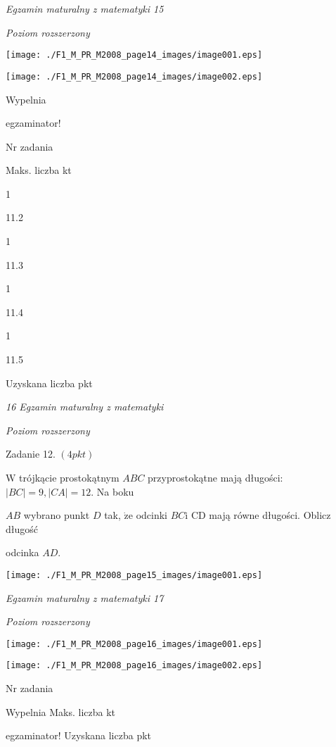 \documentclass[a4paper,12pt]{article}
\begin{document}
{\it Egzamin maturalny z matematyki 15}

{\it Poziom rozszerzony}
\begin{center}
\texttt{[image: ./F1\_M\_PR\_M2008\_page14\_images/image001.eps]}

\texttt{[image: ./F1\_M\_PR\_M2008\_page14\_images/image002.eps]}
\end{center}
Wypelnia

egzaminator!

Nr zadania

Maks. liczba kt

1

11.2

1

11.3

1

11.4

1

11.5

Uzyskana liczba pkt





{\it 16 Egzamin maturalny z matematyki}

{\it Poziom rozszerzony}

Zadanie 12. $(4pkt)$

$\mathrm{W}$ trójkącie prostokątnym $ABC$ przyprostokątne mają długości: $|BC|=9, |CA|=12$. Na boku

$AB$ wybrano punkt $D$ tak, $\dot{\mathrm{z}}\mathrm{e}$ odcinki $BC \mathrm{i}$ CD mają równe długości. Oblicz długość

odcinka $AD.$
\begin{center}
\texttt{[image: ./F1\_M\_PR\_M2008\_page15\_images/image001.eps]}
\end{center}




{\it Egzamin maturalny z matematyki 17}

{\it Poziom rozszerzony}
\begin{center}
\texttt{[image: ./F1\_M\_PR\_M2008\_page16\_images/image001.eps]}

\texttt{[image: ./F1\_M\_PR\_M2008\_page16\_images/image002.eps]}
\end{center}
Nr zadania

Wypelnia Maks. liczba kt

egzaminator! Uzyskana liczba pkt
\end{document}
